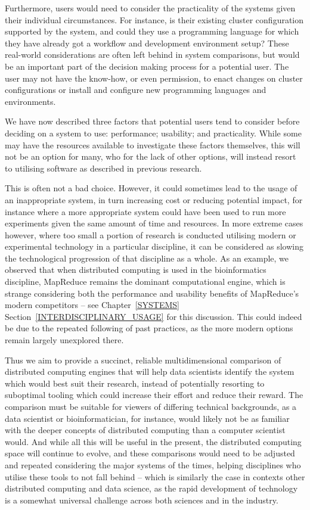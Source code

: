   Furthermore, users would need to consider the practicality of the systems given their individual circumstances. For instance, is their existing cluster configuration supported by the system, and could they use a programming language for which they have already got a workflow and development environment setup? These real-world considerations are often left behind in system comparisons, but would be an important part of the decision making process for a potential user. The user may not have the know-how, or even permission, to enact changes on cluster configurations or install and configure new programming languages and environments.
  
  We have now described three factors that potential users tend to consider before deciding on a system to use: performance; usability; and practicality. While some may have the resources available to investigate these factors themselves, this will not be an option for many, who for the lack of other options, will instead resort to utilising software as described in previous research.
  
  This is often not a bad choice. However, it could sometimes lead to the usage of an inappropriate system, in turn increasing cost or reducing potential impact, for instance where a more appropriate system could have been used to run more experiments given the same amount of time and resources. In more extreme cases however, where too small a portion of research is conducted utilising modern or experimental technology in a particular discipline, it can be considered as slowing the technological progression of that discipline as a whole. As an example, we observed that when distributed computing is used in the bioinformatics discipline, MapReduce remains the dominant computational engine, which is strange considering both the performance and usability benefits of MapReduce's modern competitors -- see Chapter~\ref{SYSTEMS} Section~\ref{INTERDISCIPLINARY_USAGE} for this discussion. This could indeed be due to the repeated following of past practices, as the more modern options remain largely unexplored there.
  
  Thus we aim to provide a succinct, reliable multidimensional comparison of distributed computing engines that will help data scientists identify the system which would best suit their research, instead of potentially resorting to suboptimal tooling which could increase their effort and reduce their reward. The comparison must be suitable for viewers of differing technical backgrounds, as a data scientist or bioinformatician, for instance, would likely not be as familiar with the deeper concepts of distributed computing than a computer scientist would. And while all this will be useful in the present, the distributed computing space will continue to evolve, and these comparisons would need to be adjusted and repeated considering the major systems of the times, helping disciplines who utilise these tools to not fall behind -- which is similarly the case in contexts other distributed computing and data science, as the rapid development of technology is a somewhat universal challenge across both sciences and in the industry.
  
